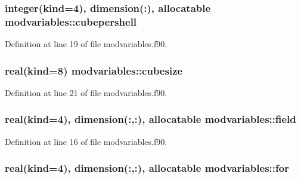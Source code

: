 \subsubsection[{\texorpdfstring{cubepershell}{cubepershell}}]{\setlength{\rightskip}{0pt plus 5cm}integer(kind=4), dimension(\+:), allocatable modvariables\+::cubepershell}\hypertarget{namespacemodvariables_a2c3c2168db3dc7c7b511d9c5a2715de5}{}\label{namespacemodvariables_a2c3c2168db3dc7c7b511d9c5a2715de5}


Definition at line 19 of file modvariables.\+f90.

\subsubsection[{\texorpdfstring{cubesize}{cubesize}}]{\setlength{\rightskip}{0pt plus 5cm}real(kind=8) modvariables\+::cubesize}\hypertarget{namespacemodvariables_a12af092709e4d0b68394a217d16c4489}{}\label{namespacemodvariables_a12af092709e4d0b68394a217d16c4489}


Definition at line 21 of file modvariables.\+f90.

\subsubsection[{\texorpdfstring{field}{field}}]{\setlength{\rightskip}{0pt plus 5cm}real(kind=4), dimension(\+:,\+:), allocatable modvariables\+::field}\hypertarget{namespacemodvariables_a07bff5345df2040ae2d0f7e6d67f9a5c}{}\label{namespacemodvariables_a07bff5345df2040ae2d0f7e6d67f9a5c}


Definition at line 16 of file modvariables.\+f90.

\subsubsection[{\texorpdfstring{for}{for}}]{\setlength{\rightskip}{0pt plus 5cm}real(kind=4), dimension(\+:,\+:), allocatable modvariables\+::for}\hypertarget{namespacemodvariables_a81417dbf044e4c170e3b3ae6eebcd6a1}{}\label{namespacemodvariables_a81417dbf044e4c170e3b3ae6eebcd6a1}


